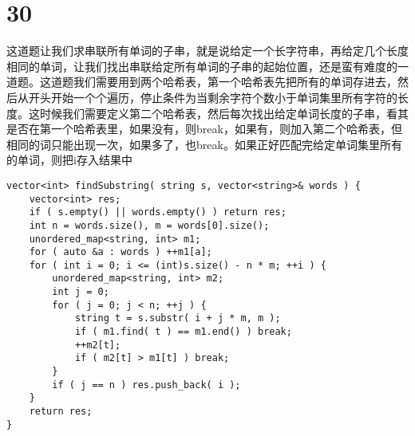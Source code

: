 \documentclass[12pt,a4paper]{article}
\begin{document}
\section{30}
\begin{CJK}{UTF8}{gbsn}
这道题让我们求串联所有单词的子串，就是说给定一个长字符串，再给定几个长度相同的单词，让我们找出串联给定所有单词的子串的起始位置，还是蛮有难度的一道题。这道题我们需要用到两个哈希表，第一个哈希表先把所有的单词存进去，然后从开头开始一个个遍历，停止条件为当剩余字符个数小于单词集里所有字符的长度。这时候我们需要定义第二个哈希表，然后每次找出给定单词长度的子串，看其是否在第一个哈希表里，如果没有，则break，如果有，则加入第二个哈希表，但相同的词只能出现一次，如果多了，也break。如果正好匹配完给定单词集里所有的单词，则把i存入结果中
\end{CJK}
\begin{lstlisting}
vector<int> findSubstring( string s, vector<string>& words ) {
	vector<int> res;
	if ( s.empty() || words.empty() ) return res;
	int n = words.size(), m = words[0].size();
	unordered_map<string, int> m1;
	for ( auto &a : words ) ++m1[a];
	for ( int i = 0; i <= (int)s.size() - n * m; ++i ) {
		unordered_map<string, int> m2;
		int j = 0;
		for ( j = 0; j < n; ++j ) {
			string t = s.substr( i + j * m, m );
			if ( m1.find( t ) == m1.end() ) break;
			++m2[t];
			if ( m2[t] > m1[t] ) break;
		}
		if ( j == n ) res.push_back( i );
	}
	return res;
}
\end{lstlisting}
\end{document}
